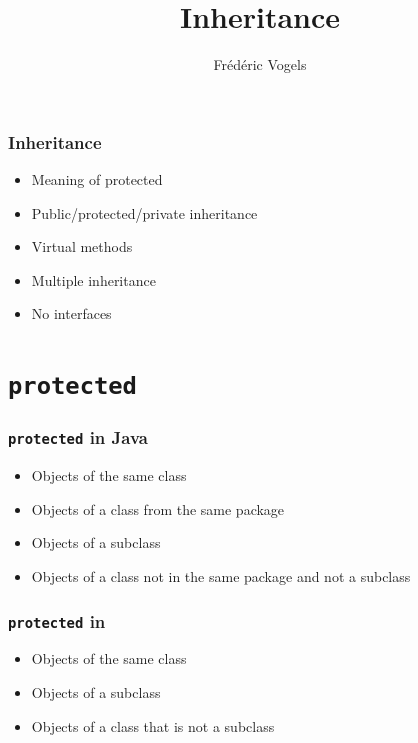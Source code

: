 \documentclass{../ucll-slides}
\title{Inheritance}
\author{Fr\'ed\'eric Vogels}
\begin{document}
\begin{frame}
  \titlepage
\end{frame}

\begin{frame}
  \frametitle{Inheritance}
  \begin{itemize}
    \item Meaning of protected
    \item Public/protected/private inheritance
    \item Virtual methods
    \item Multiple inheritance
    \item No interfaces
  \end{itemize}
\end{frame}

\section{{\tt protected}}

\begin{frame}
  \tableofcontents[currentsection]
\end{frame}

\begin{frame}
  \frametitle{{\tt protected} in Java}
  \begin{itemize}
    \item Objects of the same class
    \item Objects of a class from the same package
    \item Objects of a subclass
  \end{itemize}
  \vskip5mm
  \begin{itemize}
    \item Objects of a class not in the same package and not a subclass
  \end{itemize}
\end{frame}

\begin{frame}
  \frametitle{{\tt protected} in \cpp}
  \begin{itemize}
    \item Objects of the same class
    \item Objects of a subclass
  \end{itemize}
  \vskip5mm
  \begin{itemize}
    \item Objects of a class that is not a subclass
  \end{itemize}
\end{frame}
\end{document}
